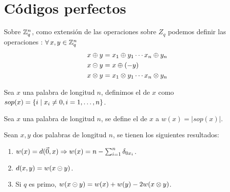 \section{Códigos perfectos}

Sobre $\mathbb{Z}_q^n$, como extensión de las operaciones sobre $Z_q$ podemos definir las operaciones : $\forall x, y\in\Z_q^n$
\begin{align*}
	x\oplus y &= x_1\oplus y_1\cdots x_n\oplus y_n\\
	x\circleddash y &= x\oplus (-y)\\
	x\otimes y &= x_1\otimes y_1\cdots x_n\otimes y_n
\end{align*}

\begin{definition}
	Sea $x$ una palabra de longitud $n$, definimos el  de $x$ como $sop(x)=\left\{i\mid x_i\neq 0, i=1,\dots, n\right\}$.
\end{definition}

\begin{definition}
	Sea $x$ una palabra de longitud $n$, se define el  de $x$ a $w(x)=|sop(x)|$.
\end{definition}
\begin{lemma}
	\label{res:distancia-peso}
	Sean $x, y$ dos palabras de longitud $n$, se tienen los siguientes resultados:
	\begin{enumerate}
		\item $w(x) = d(\vec{0},x)\Rightarrow w(x)=n-\sum_{i=1}^n \delta_{0x_i}$.
		\item $d(x,y)=w(x\circleddash y)$.
		\item Si $q$ es primo, $w(x\circleddash y)=w(x)+w(y)-2w(x\otimes y)$.
	\end{enumerate}
\end{lemma}

